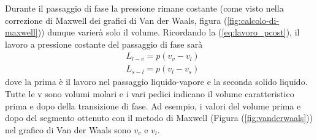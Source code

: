 \documentclass[
10pt, %
a4paper, %
oneside, %
headinclude,footinclude, %
BCOR5mm, %
]{scrartcl}
\begin{document}
Durante il passaggio di fase la pressione rimane costante (come visto nella correzione di Maxwell dei grafici di Van der Waals, figura (\ref{fig:calcolo-di-maxwell})) dunque varierà solo il volume. Ricordando la (\ref{eq:lavoro_pcost}), il lavoro a pressione costante del passaggio di fase sarà
\begin{align*} 
	&L_{l-v} = p(v_v-v_l)\\
	&L_{s-l} = p(v_l-v_s)
\end{align*} 
dove la prima è il lavoro nel passaggio liquido-vapore e la seconda solido liquido. Tutte le v sono volumi molari e i vari pedici indicano il volume caratteristico prima e dopo della transizione di fase. Ad esempio, i valori del volume prima e dopo del segmento ottenuto con il metodo di Maxwell (Figura (\ref{fig:vanderwaals})) nel grafico di Van der Waals sono $v_v$ e $v_l$.
\end{document}
